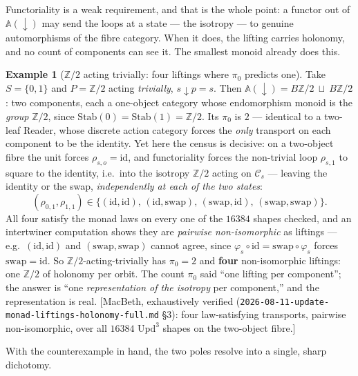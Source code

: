 \documentclass[11pt,a4paper]{book}
\newcommand{\id}{\mathrm{id}}
\theoremstyle{plain}
\theoremstyle{definition}
\newtheorem{Example}[Theorem]{Example}
\theoremstyle{remark}
\newcommand{\prov}[1]{\hfill\textsf{\footnotesize[#1]}}
\begin{document}
Functoriality is a weak requirement, and that is the whole point: a functor out of $\mathbb A(\downarrow)$
may send the loops at a state --- the isotropy --- to genuine automorphisms of the fibre category. When
it does, the lifting carries holonomy, and no count of components can see it. The smallest monoid already
does this.

\begin{Example}[$\mathbb Z/2$ acting trivially: four liftings where $\pi_{0}$ predicts one]\label{ex:z2-holonomy}
Take $S=\{0,1\}$ and $P=\mathbb Z/2$ acting \emph{trivially}, $s{\downarrow}p=s$. Then
$\mathbb A(\downarrow)=B\mathbb Z/2\ \sqcup\ B\mathbb Z/2$: two components, each a one-object category
whose endomorphism monoid is the \emph{group} $\mathbb Z/2$, since $\mathrm{Stab}(0)=\mathrm{Stab}(1)=
\mathbb Z/2$. Its $\pi_{0}$ is $2$ --- identical to a two-leaf Reader, whose discrete action category
forces the \emph{only} transport on each component to be the identity. Yet here the census is decisive:
on a two-object fibre the unit forces $\rho_{s,o}=\id$, and
functoriality forces the non-trivial loop $\rho_{s,1}$ to square to the identity, i.e.\ into the isotropy
$\mathbb Z/2$ acting on $\mathcal C_{s}$ --- leaving the identity or the swap, \emph{independently at each
of the two states}:
\[
   (\rho_{0,1},\rho_{1,1})\in\{(\id,\id),\,(\id,\mathrm{swap}),\,(\mathrm{swap},\id),\,(\mathrm{swap},\mathrm{swap})\}.
\]
All four satisfy the monad laws on every one of the $16384$ shapes checked, and an intertwiner
computation shows they are \emph{pairwise non-isomorphic} as liftings --- e.g.\ $(\id,\id)$ and
$(\mathrm{swap},\mathrm{swap})$ cannot agree, since $\varphi_{s}\circ\id=\mathrm{swap}\circ\varphi_{s}$
forces $\mathrm{swap}=\id$. So $\mathbb Z/2$-acting-trivially has $\pi_{0}=2$ and \textbf{four}
non-isomorphic liftings: one $\mathbb Z/2$ of holonomy per orbit. The count $\pi_{0}$ said ``one lifting
per component''; the answer is ``one \emph{representation of the isotropy} per component,'' and the
representation is real.
\prov{MacBeth, exhaustively verified (\texttt{2026-08-11-update-monad-liftings-holonomy-full.md} \S3):
four law-satisfying transports, pairwise non-isomorphic, over all $16384$ $\mathrm{Upd}^{3}$ shapes on
the two-object fibre.}
\end{Example}

With the counterexample in hand, the two poles resolve into a single, sharp dichotomy.
\end{document}
